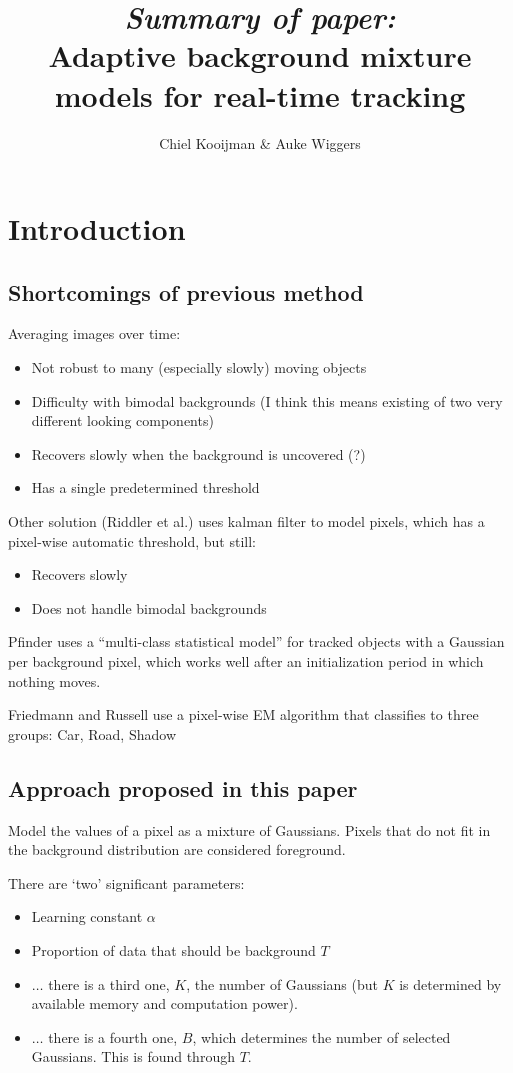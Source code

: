 \documentclass{article}
\title{\emph{Summary of paper:}\\Adaptive background mixture models for real-time
tracking}
\author{Chiel Kooijman \& Auke Wiggers}
\begin{document}
\maketitle

\section{Introduction}
\subsection{Shortcomings of previous method}
	Averaging images over time:
	\begin{itemize}
		\item Not robust to many (especially slowly) moving objects
		\item Difficulty with bimodal backgrounds (I think this means existing
		of two very different looking components)
		\item Recovers slowly when the background is uncovered (?)
		\item Has a single predetermined threshold
	\end{itemize}
	Other solution (Riddler et al.) uses kalman filter to model pixels, which
	has a pixel-wise automatic threshold, but still:
	\begin{itemize}
	\item Recovers slowly
	\item Does not handle bimodal backgrounds
	\end{itemize}

	Pfinder uses a ``multi-class statistical model'' for tracked objects with a
	Gaussian per background pixel, which works well after an initialization
	period in which nothing moves.

	Friedmann and Russell use a pixel-wise EM algorithm that classifies to
	three groups: Car, Road, Shadow


\subsection{Approach proposed in this paper}
	Model the values of a pixel as a mixture of Gaussians. Pixels that do not
	fit in the background distribution are considered foreground.

	There are `two' significant parameters:
	\begin{itemize}
	\item Learning constant $\alpha$
	\item Proportion of data that should be background $T$
	\item $\ldots$ there is a third one, $K$, the number of Gaussians (but $K$ is determined by available memory and computation power).
	\item $\ldots$ there is a fourth one, $B$, which determines the number of selected Gaussians. This is found through $T$.
	\end{itemize}
\end{document}
